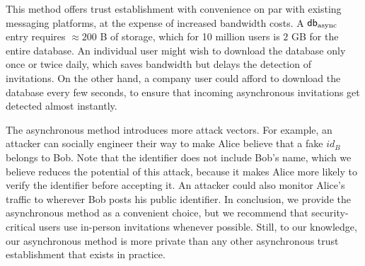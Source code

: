 This method offers trust establishment with convenience on par with existing messaging platforms, at the expense of increased bandwidth costs. A $\mathsf{db}_\text{async}$ entry requires $\approx200$ B of storage, which for 10 million users is $2$ GB for the entire database. An individual user might wish to download the database only once or twice daily, which saves bandwidth but delays the detection of invitations. On the other hand, a company user could afford to download the database every few seconds, to ensure that incoming asynchronous invitations get detected almost instantly.

The asynchronous method introduces more attack vectors. For example, an attacker can socially engineer their way to make Alice believe that a fake $id_B$ belongs to Bob. Note that the identifier does not include Bob's name, which we believe reduces the potential of this attack, because it makes Alice more likely to verify the identifier before accepting it. An attacker could also monitor Alice's traffic to wherever Bob posts his public identifier. In conclusion, we provide the asynchronous method as a convenient choice, but we recommend that security-critical users use in-person invitations whenever possible. Still, to our knowledge, our asynchronous method is more private than any other asynchronous trust establishment that exists in practice.